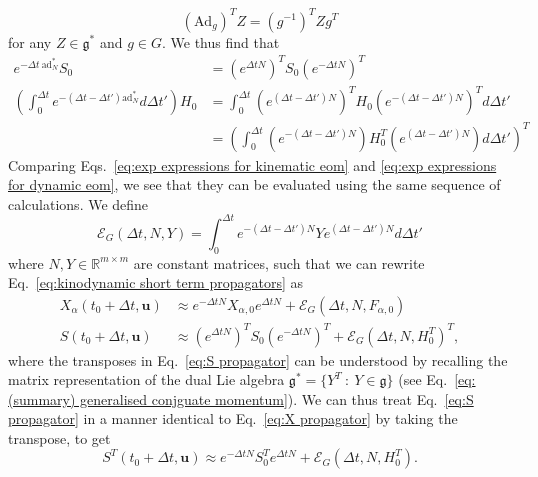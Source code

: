 \begin{equation} \label{eq:adjoint action 2}
(\text{Ad}_g)^T Z = (g^{-1})^T Z g^T
\end{equation} 
for any $Z \in \mathfrak{g}^*$ and $g \in G$. We thus find that
\begin{subequations} \label{eq:exp expressions for dynamic eom}
	\begin{align}
		e^{-\Delta t\ \text{ad}^*_N} S_0 & = (e^{\Delta t N})^T S_0 (e^{- \Delta t N})^T \\
		\left( \int_0^{\Delta t} e^{-(\Delta t - \Delta t') \text{ad}^*_N} d \Delta t' \right) H_0 & = \int_0^{\Delta t} (e^{(\Delta t - \Delta t') N})^T H_0 (e^{-(\Delta t - \Delta t') N})^T d \Delta t' \nonumber \\
		& = \left( \int_0^{\Delta t} (e^{-(\Delta t - \Delta t') N}) H_0^T (e^{(\Delta t - \Delta t') N}) d \Delta t' \right)^T 
	\end{align}
\end{subequations}
Comparing Eqs.~\ref{eq:exp expressions for kinematic eom} and \ref{eq:exp expressions for dynamic eom}, we see that they can be evaluated using the same sequence of calculations. We define
\begin{equation}
	\mathscr{E}_G(\Delta t, N, Y) = \int_0^{\Delta t} e^{-(\Delta t - \Delta t') N} Y e^{(\Delta t - \Delta t') N} d \Delta t'
\end{equation}
where $N,Y \in \mathbb{R}^{m \times m}$ are constant matrices, such that we can rewrite Eq.~\ref{eq:kinodynamic short term propagators} as
\begin{subequations} \label{eq:kinodynamic short term propagators}
	\begin{align}
		X_{\alpha}(t_0 + \Delta t, \mathbf{u}) & \approx e^{- \Delta t N} X_{\alpha, 0} e^{ \Delta t N} + \mathscr{E}_G(\Delta t, N, F_{\alpha, 0}) \label{eq:X propagator} \\
		S(t_0 + \Delta t, \mathbf{u}) & \approx (e^{\Delta t N})^T S_0 (e^{-\Delta t N})^T + \mathscr{E}_G(\Delta t, N, H_0^T)^T, \label{eq:S propagator}
	\end{align}
\end{subequations}
where the transposes in Eq.~\ref{eq:S propagator} can be understood by recalling the matrix representation of the dual Lie algebra $\mathfrak{g}^* = \{ Y^T\ :\ Y \in \mathfrak{g} \}$ (see Eq.~\ref{eq:(summary) generalised conjguate momentum}). We can thus treat Eq.~\ref{eq:S propagator} in a manner identical to Eq.~\ref{eq:X propagator} by taking the transpose, to get
\begin{equation} 
	S^T(t_0 + \Delta t, \mathbf{u}) \approx e^{-\Delta t N} S^T_0 e^{\Delta t N} + \mathscr{E}_G(\Delta t, N, H_0^T).
\end{equation}
